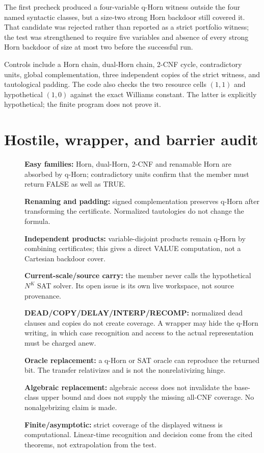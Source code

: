 \documentclass[11pt]{article}
\begin{document}
The first precheck produced a four-variable q-Horn witness outside the four
named syntactic classes, but a size-two strong Horn backdoor still covered it.
That candidate was rejected rather than reported as a strict portfolio
witness; the test was strengthened to require five variables and absence of
every strong Horn backdoor of size at most two before the successful run.

Controls include a Horn chain, dual-Horn chain, 2-CNF cycle, contradictory
units, global complementation, three independent copies of the strict
witness, and tautological padding.  The code also checks the two resource
cells $(1,1)$ and hypothetical $(1,0)$ against the exact Williams constant.
The latter is explicitly hypothetical; the finite program does not prove it.

\section{Hostile, wrapper, and barrier audit}
\begin{description}
\item[] \textbf{Easy families:} Horn, dual-Horn, 2-CNF and renamable Horn
are absorbed by q-Horn; contradictory units confirm that the member must
return FALSE as well as TRUE.
\item[] \textbf{Renaming and padding:} signed complementation preserves
q-Horn after transforming the certificate.  Normalized tautologies do not
change the formula.
\item[] \textbf{Independent products:} variable-disjoint products remain
q-Horn by combining certificates; this gives a direct VALUE computation, not
a Cartesian backdoor cover.
\item[] \textbf{Current-scale/source carry:} the member never calls the
hypothetical $N^K$ SAT solver.  Its open issue is its own live workspace, not
source provenance.
\item[] \textbf{DEAD/COPY/DELAY/INTERP/RECOMP:} normalized dead clauses and
copies do not create coverage.  A wrapper may hide the q-Horn writing, in
which case recognition and access to the actual representation must be
charged anew.
\item[] \textbf{Oracle replacement:} a q-Horn or SAT oracle can reproduce
the returned bit.  The transfer relativizes and is not the nonrelativizing
hinge.
\item[] \textbf{Algebraic replacement:} algebraic access does not invalidate
the base-class upper bound and does not supply the missing all-CNF coverage.
No nonalgebrizing claim is made.
\item[] \textbf{Finite/asymptotic:} strict coverage of the displayed witness
is computational.  Linear-time recognition and decision come from the cited
theorems, not extrapolation from the test.
\end{description}
\end{document}
